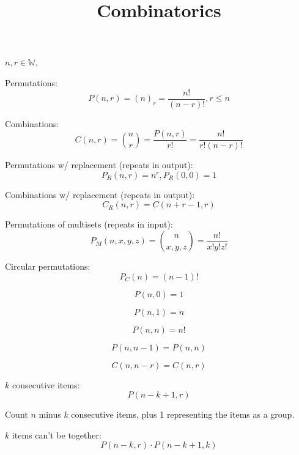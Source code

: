 \documentclass{article}
\title{Combinatorics}
\begin{document}
    \maketitle
    
    $n,r \in \mathbb{W}$.
    
    Permutations: \begin{equation}
        P(n, r) = (n)_r = \frac{n!}{(n - r)!}, r \leq n
    \end{equation}

    Combinations: \begin{equation}
        C(n, r) = {n \choose r} = \frac{P(n, r)}{r!} = \frac{n!}{r!(n - r)!}
    \end{equation}

    Permutations w/ replacement (repeats in output): \begin{equation}
        P_R(n, r) = n^r, P_R(0, 0) = 1
    \end{equation}

    Combinations w/ replacement (repeats in output): \begin{equation}
        C_R(n, r) = C(n + r - 1, r)
    \end{equation}

    Permutations of multisets (repeats in input): \begin{equation}
        P_M(n, x, y, z) = {n \choose x, y, z} = \frac{n!}{x!y!z!}
    \end{equation}

    Circular permutations: \begin{equation}
        P_C(n) = (n - 1)!
    \end{equation}

    $$P(n, 0) = 1$$

    $$P(n, 1) = n$$

    $$P(n, n) = n!$$
    
    $$P(n, n - 1) = P(n, n)$$
    
    $$C(n, n - r) = C(n, r)$$

    $k$ consecutive items: \begin{equation}
        P(n - k + 1, r)
    \end{equation}

    Count $n$ minus $k$ consecutive items, plus 1 representing the items as a group.

    $k$ items can't be together: \begin{equation}
        P(n - k, r) \cdot P(n - k + 1, k)
    \end{equation}
\end{document}
